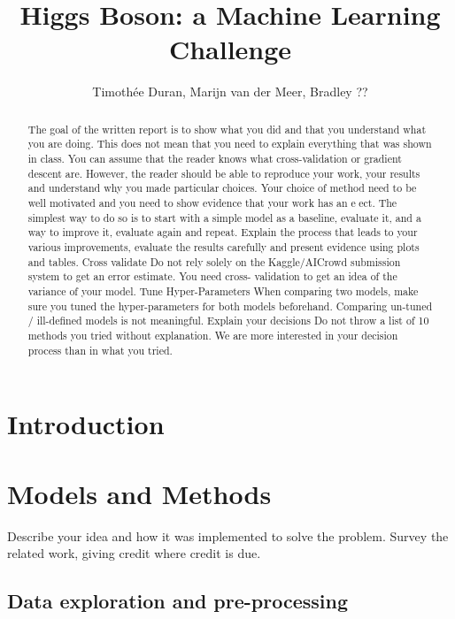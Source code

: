 \documentclass[10pt,conference,compsocconf]{IEEEtran}
\begin{document}
\title{Higgs Boson: a Machine Learning Challenge}

\author{
  Timothée Duran, Marijn van der Meer, Bradley ?? 
}

\maketitle

\begin{abstract}

 The goal of the written report is to show what you did and that you understand what you are doing. This does
not mean that you need to explain everything that was shown in class. You can assume that the reader knows
what cross-validation or gradient descent are. However, the reader should be able to reproduce your work, your
results and understand why you made particular choices. Your choice of method need to be well motivated and
you need to show evidence that your work has an eect.
The simplest way to do so is to start with a simple model as a baseline, evaluate it, and a way to improve it,
evaluate again and repeat. Explain the process that leads to your various improvements, evaluate the results
carefully and present evidence using plots and tables.
Cross validate
Do not rely solely on the Kaggle/AICrowd submission system to get an error estimate. You need cross-
validation to get an idea of the variance of your model.
Tune Hyper-Parameters
When comparing two models, make sure you tuned the hyper-parameters for both models beforehand.
Comparing un-tuned / ill-defined models is not meaningful.
Explain your decisions
Do not throw a list of 10 methods you tried without explanation. We are more interested in your decision
process than in what you tried.
\end{abstract}

\section{Introduction}\label{sec: introduction}

\section{Models and Methods}\label{sec: models_methods}
Describe your idea and how it was implemented to solve
  the problem. Survey the related work, giving credit where credit is
  due.
  \subsection{Data exploration and pre-processing}\label{subsec:data_cleaning}
\end{document}
